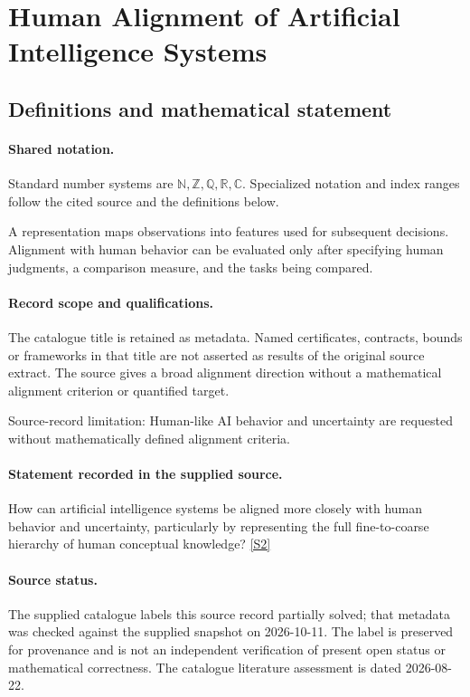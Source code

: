 \documentclass[11pt]{article}
\newcommand{\sref}[2]{\hyperlink{source:#1:#2}{[S#2]}}
\begin{document}
\section{Human Alignment of Artificial Intelligence Systems}\label{statement}

\subsection{Definitions and mathematical statement}

\paragraph{Shared notation.}Standard number systems are $\mathbb N,\mathbb Z,\mathbb Q,\mathbb R,\mathbb C$. Specialized notation and index ranges follow the cited source and the definitions below.


A representation maps observations into features used for subsequent decisions. Alignment with human behavior can be evaluated only after specifying human judgments, a comparison measure, and the tasks being compared.
\paragraph{Record scope and qualifications.}
The catalogue title is retained as metadata. Named certificates, contracts, bounds or frameworks in that title are not asserted as results of the original source extract.
The source gives a broad alignment direction without a mathematical alignment criterion or quantified target.

Source-record limitation: Human-like AI behavior and uncertainty are requested without mathematically defined alignment criteria.
\paragraph{Statement recorded in the supplied source.}
How can artificial intelligence systems be aligned more closely with human behavior and uncertainty, particularly by representing the full fine-to-coarse hierarchy of human conceptual knowledge? \sref{statement}{2}
\paragraph{Source status.}
The supplied catalogue labels this source record partially solved; that metadata was checked against the supplied snapshot on 2026-10-11. The label is preserved for provenance and is not an independent verification of present open status or mathematical correctness. The catalogue literature assessment is dated 2026-08-22.
\end{document}
